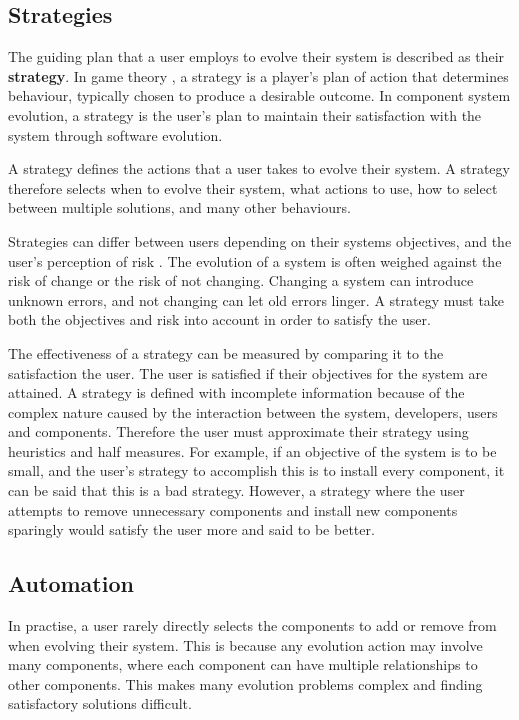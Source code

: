 \subsection{Strategies}
The guiding plan that a user employs to evolve their system is described as their \textbf{strategy}.
In game theory \citep{rubinstein1991comments}, a strategy is a player's plan of action that determines behaviour, typically chosen to produce a desirable outcome.
In component system evolution, a strategy is the user's plan to maintain their satisfaction with the system through software evolution.

A strategy defines the actions that a user takes to evolve their system.
A strategy therefore selects when to evolve their system, what actions to use, how to select between multiple solutions, and many other behaviours.

Strategies can differ between users depending on their systems objectives, and the user's perception of risk \citep{iso2009}.
The evolution of a system is often weighed against the risk of change or the risk of not changing.
Changing a system can introduce unknown errors, and not changing can let old errors linger. 
A strategy must take both the objectives and risk into account in order to satisfy the user.

The effectiveness of a strategy can be measured by comparing it to the satisfaction the user.
The user is satisfied if their objectives for the system are attained.
A strategy is defined with incomplete information because of the complex nature caused by the interaction between the system, developers, users and components.
Therefore the user must approximate their strategy using heuristics and half measures.
For example, if an objective of the system is to be small, and the user's strategy to accomplish this is to install every component, it can be said that this is a bad strategy. 
However, a strategy where the user attempts to remove unnecessary components and install new components sparingly would satisfy the user more and said to be better.

\subsection{Automation}
In practise, a user rarely directly selects the components to add or remove from when evolving their system.
This is because any evolution action may involve many components, where each component can have multiple relationships to other components.
This makes many evolution problems complex and finding satisfactory solutions difficult.

